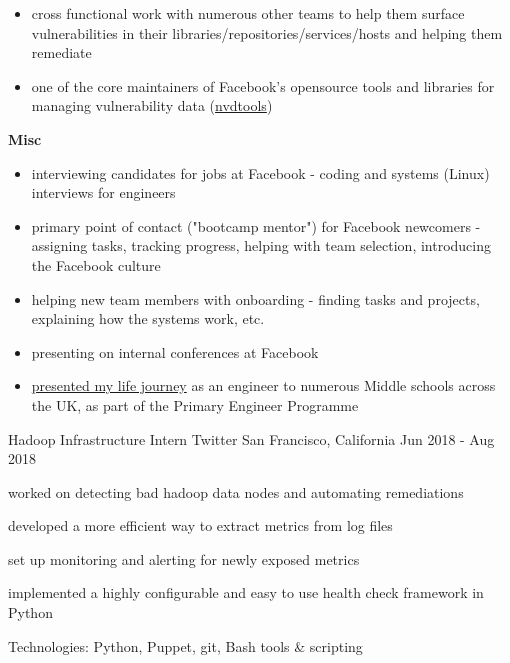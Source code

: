 \begin{cventries}
{\begin{cvitems}
{\begin{itemize}
            \item {cross functional work with numerous other teams to help them surface vulnerabilities in their libraries/repositories/services/hosts and helping them remediate}
            \item {one of the core maintainers of Facebook's opensource tools and libraries for managing vulnerability data (\href{https://github.com/facebookincubator/nvdtools}{nvdtools})}
          \end{itemize}
        }
        \item {
          \textbf{Misc}
          \begin{itemize}
            \item {interviewing candidates for jobs at Facebook - coding and systems (Linux) interviews for engineers}
            \item {primary point of contact ("bootcamp mentor") for Facebook newcomers - assigning tasks, tracking progress, helping with team selection, introducing the Facebook culture}
            \item {helping new team members with onboarding - finding tasks and projects, explaining how the systems work, etc.}
            \item {presenting on internal conferences at Facebook}
            \item {\href{https://www.youtube.com/watch?v=wP3OpdfOYok}{presented my life journey} as an engineer to numerous Middle schools across the UK, as part of the Primary Engineer Programme}
          \end{itemize}
        }
      \end{cvitems}
    }

  \cventry
    {Hadoop Infrastructure Intern} %
    {Twitter} %
    {San Francisco, California} %
    {Jun 2018 - Aug 2018} %
    {
      \begin{cvitems} %
        \item {worked on detecting bad hadoop data nodes and automating remediations}
        \item {developed a more efficient way to extract metrics from log files}
        \item {set up monitoring and alerting for newly exposed metrics}
        \item {implemented a highly configurable and easy to use health check framework in Python}
        \item {Technologies: Python, Puppet, git, Bash tools \& scripting}
      \end{cvitems}
    }


\end{cventries}
